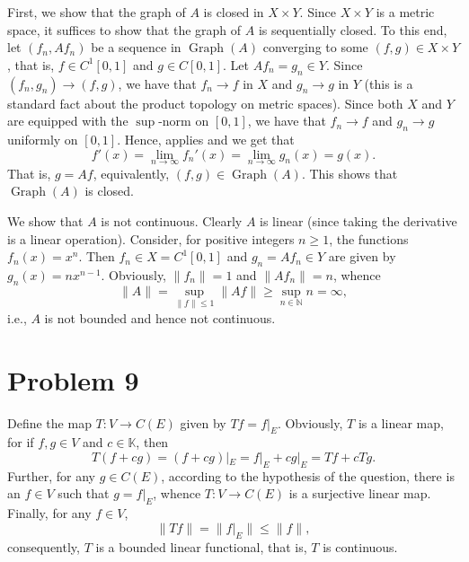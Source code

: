 \documentclass[10pt]{amsart}
\theoremstyle{thmstyle}
\theoremstyle{defstyle}
\newcommand{\N}{\mathbb{N}}
\newcommand{\K}{\mathbb{K}}
\renewcommand{\le}{\leqslant}
\renewcommand{\ge}{\geqslant}
\newcommand{\Graph}{\operatorname{Graph}}
\begin{document}
First, we show that the graph of $A$ is closed in $X\times Y$. Since $X\times Y$ is a metric space, it suffices to show that the graph of $A$ is sequentially closed. To this end, let $(f_n, Af_n)$ be a sequence in $\Graph(A)$ converging to some $(f, g)\in X\times Y$, that is, $f\in C^1[0, 1]$ and $g\in C[0, 1]$. Let $Af_n = g_n\in Y$. Since $(f_n, g_n)\to (f, g)$, we have that $f_n\to f$ in $X$ and $g_n\to g$ in $Y$ (this is a standard fact about the product topology on metric spaces). Since both $X$ and $Y$ are equipped with the $\sup$-norm on $[0, 1]$, we have that $f_n\to f$ and $g_n\to g$ uniformly on $[0, 1]$. Hence,  applies and we get that 
\begin{equation*}
	f'(x) = \lim_{n\to\infty} f_n'(x) = \lim_{n\to\infty} g_n(x) = g(x).
\end{equation*}
That is, $g = Af$, equivalently, $(f, g)\in\Graph(A)$. This shows that $\Graph(A)$ is closed.

We show that $A$ is not continuous. Clearly $A$ is linear (since taking the derivative is a linear operation). Consider, for positive integers $n\ge 1$,  the functions $f_n(x) = x^n$. Then $f_n\in X = C^1[0, 1]$ and $g_n = Af_n\in Y$ are given by $g_n(x) = nx^{n - 1}$. Obviously, $\|f_n\| = 1$ and $\|Af_n\| = n$, whence 
\begin{equation*}
	\|A\| = \sup_{\|f\|\le 1}\|Af\|\ge\sup_{n\in\N} n = \infty,
\end{equation*}
i.e., $A$ is not bounded and hence not continuous.


\section{Problem 9}

Define the map $T: V\to C(E)$ given by $Tf = f|_E$. Obviously, $T$ is a linear map, for if $f,g\in V$ and $c\in\K$, then 
\begin{equation*}
	T(f + cg) = (f + cg)|_E = f|_E + cg|_E = Tf + cTg.
\end{equation*}
Further, for any $g\in C(E)$, according to the hypothesis of the question, there is an $f\in V$ such that $g = f|_E$, whence $T: V\to C(E)$ is a surjective linear map. Finally, for any $f\in V$, 
\begin{equation*}
	\|Tf\| = \|f|_E\|\le \|f\|,
\end{equation*}
consequently, $T$ is a bounded linear functional, that is, $T$ is continuous.
\end{document}
